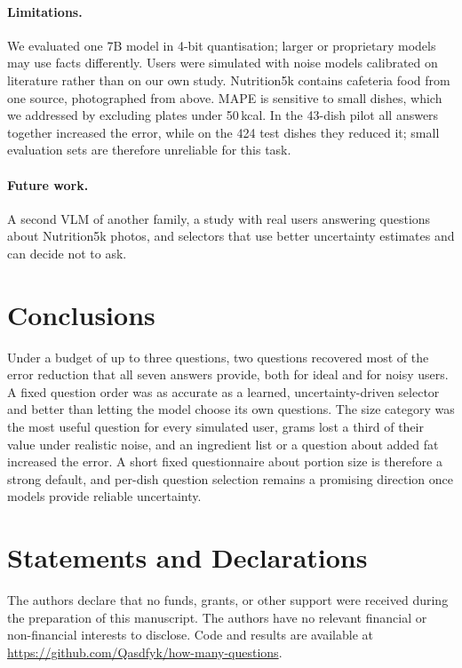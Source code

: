 \documentclass[twocolumn]{svjour3}
\begin{document}
\paragraph{Limitations.}
We evaluated one 7B model in 4-bit quantisation; larger or proprietary models may use facts differently.
Users were simulated with noise models calibrated on literature rather than on our own study. Nutrition5k
contains cafeteria food from one source, photographed from above. MAPE is sensitive to small dishes, which
we addressed by excluding plates under 50\,kcal. In the 43-dish pilot all answers together increased the
error, while on the 424 test dishes they reduced it; small evaluation sets are therefore unreliable for this
task.

\paragraph{Future work.}
A second VLM of another family, a study with real users answering questions about Nutrition5k photos, and
selectors that use better uncertainty estimates and can decide not to ask.

\section{Conclusions}
\label{sec:conclusions}
Under a budget of up to three questions, two questions recovered most of the error reduction that all seven
answers provide, both for ideal and for noisy users. A fixed question order was as accurate as a learned,
uncertainty-driven selector and better than letting the model choose its own questions. The size category
was the most useful question for every simulated user, grams lost a third of their value under realistic
noise, and an ingredient list or a question about added fat increased the error. A short fixed questionnaire
about portion size is therefore a strong default, and per-dish question selection remains a promising
direction once models provide reliable uncertainty.

\section*{Statements and Declarations}
The authors declare that no funds, grants, or other support were received during the preparation of this
manuscript. The authors have no relevant financial or non-financial interests to disclose. Code and results
are available at \url{https://github.com/Qasdfyk/how-many-questions}.

\balance


\end{document}
